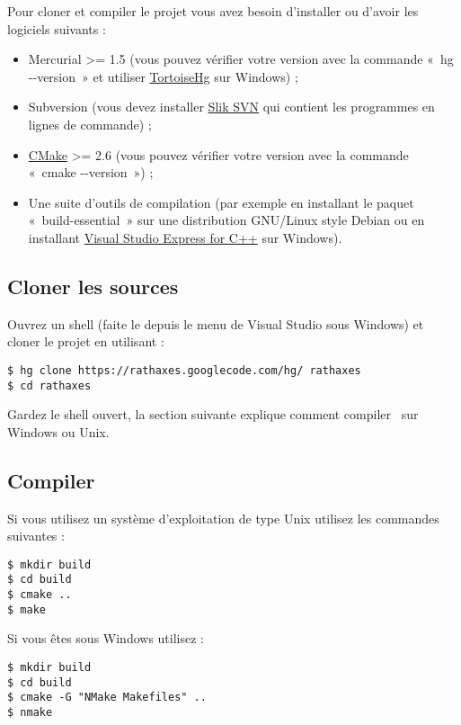 \documentclass[francais]{rtxarticle}
\begin{document}
Pour cloner et compiler le projet vous avez besoin d'installer ou d'avoir les
logiciels suivants :
\begin{itemize}
\item Mercurial >= 1.5 (vous pouvez vérifier votre version avec la commande
      «~hg {-}{-}version~» et utiliser
      \href{http://tortoisehg.bitbucket.org/download/index.html}{TortoiseHg}
      sur Windows) ;
\item Subversion (vous devez installer
      \href{http://www.sliksvn.com/en/download}{Slik SVN} qui contient les
      programmes en lignes de commande) ;
\item \href{http://www.cmake.org/cmake/resources/software.html}{CMake} >= 2.6
      (vous pouvez vérifier votre version avec la commande «~cmake {-}{-}version~») ;
\item Une suite d'outils de compilation (par exemple en installant le paquet
      «~build-essential~» sur une distribution GNU/Linux style Debian ou en
      installant
      \href{http://www.microsoft.com/express/Downloads/#2010-Visual-CPP}{Visual
      Studio Express for C++} sur Windows).
\end{itemize}

\subsection{Cloner les sources}

Ouvrez un shell (faite le depuis le menu de Visual Studio sous Windows) et
cloner le projet en utilisant :

\begin{lstlisting}
$ hg clone https://rathaxes.googlecode.com/hg/ rathaxes
$ cd rathaxes
\end{lstlisting}

Gardez le shell ouvert, la section suivante explique comment compiler \rtx\ sur
Windows ou Unix.

\subsection{Compiler \rtx}

Si vous utilisez un système d'exploitation de type Unix utilisez les commandes
suivantes :

\begin{lstlisting}
$ mkdir build
$ cd build
$ cmake ..
$ make
\end{lstlisting}

Si vous êtes sous Windows utilisez :

\begin{lstlisting}
$ mkdir build
$ cd build
$ cmake -G "NMake Makefiles" ..
$ nmake
\end{lstlisting}

\rtxmaketitleblock
\end{document}

